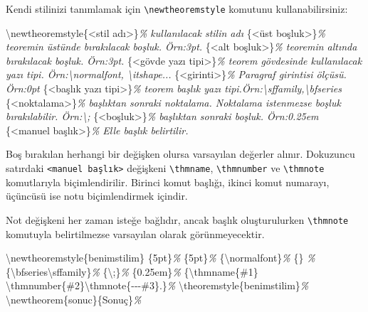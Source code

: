 \documentclass[
  10pt,
]{scrbook}
\newenvironment{Shaded}{\begin{snugshade}}{\end{snugshade}}
\newcommand{\CommentTok}[1]{\textcolor[rgb]{0.56,0.35,0.01}{\textit{#1}}}
\newcommand{\FunctionTok}[1]{\textcolor[rgb]{0.00,0.00,0.00}{#1}}
\newcommand{\NormalTok}[1]{#1}
\theoremstyle{definition}
\theoremstyle{definition}
\theoremstyle{definition}
\theoremstyle{definition}
\theoremstyle{remark}
\begin{document}
Kendi stilinizi tanımlamak için \texttt{\textbackslash{}newtheoremstyle} komutunu
kullanabilirsiniz:

\begin{Shaded}
\begin{Highlighting}[]
\FunctionTok{\textbackslash{}newtheoremstyle}\NormalTok{\{\textless{}stil adı\textgreater{}\}}\CommentTok{\% kullanılacak stilin adı}
\NormalTok{\{\textless{}üst boşluk\textgreater{}\}}\CommentTok{\% teoremin üstünde bırakılacak boşluk. Örn:3pt.}
\NormalTok{\{\textless{}alt boşluk\textgreater{}\}}\CommentTok{\% teoremin altında bırakılacak boşluk. Örn:3pt.}
\NormalTok{\{\textless{}gövde yazı tipi\textgreater{}\}}\CommentTok{\% teorem gövdesinde kullanılacak yazı tipi. Örn:\textbackslash{}normalfont, \textbackslash{}itshape...}
\NormalTok{\{\textless{}girinti\textgreater{}\}}\CommentTok{\% Paragraf girintisi ölçüsü. Örn:0pt}
\NormalTok{\{\textless{}başlık yazı tipi\textgreater{}\}}\CommentTok{\% teorem başlık yazı tipi.Örn:\textbackslash{}sffamily,\textbackslash{}bfseries}
\NormalTok{\{\textless{}noktalama\textgreater{}\}}\CommentTok{\% başlıktan sonraki noktalama. Noktalama istenmezse boşluk bırakılabilir. Örn:\textbackslash{}; }
\NormalTok{\{\textless{}boşluk\textgreater{}\}}\CommentTok{\% başlıktan sonraki boşluk. Örn:0.25em}
\NormalTok{\{\textless{}manuel başlık\textgreater{}\}}\CommentTok{\% Elle başlık belirtilir.}
\end{Highlighting}
\end{Shaded}

Boş bırakılan herhangi bir değişken olursa varsayılan değerler alınır.
Dokuzuncu satırdaki \texttt{\textless{}manuel\ başlık\textgreater{}} değişkeni \texttt{\textbackslash{}thmname}, \texttt{\textbackslash{}thmnumber}
ve \texttt{\textbackslash{}thmnote} komutlarıyla biçimlendirilir. Birinci komut başlığı,
ikinci komut numarayı, üçüncüsü ise notu biçimlendirmek içindir.

Not değişkeni her zaman isteğe bağlıdır, ancak başlık oluşturulurken
\texttt{\textbackslash{}thmnote} komutuyla belirtilmezse varsayılan olarak görünmeyecektir.

\begin{Shaded}
\begin{Highlighting}[]
\FunctionTok{\textbackslash{}newtheoremstyle}\NormalTok{\{benimstilim\}}
\NormalTok{\{5pt\}}\CommentTok{\% }
\NormalTok{\{5pt\}}\CommentTok{\% }
\NormalTok{\{}\FunctionTok{\textbackslash{}normalfont}\NormalTok{\}}\CommentTok{\% }
\NormalTok{\{\} }\CommentTok{\%}
\NormalTok{\{}\FunctionTok{\textbackslash{}bfseries\textbackslash{}sffamily}\NormalTok{\}}\CommentTok{\%}
\NormalTok{\{}\FunctionTok{\textbackslash{};}\NormalTok{\}}\CommentTok{\% }
\NormalTok{\{0.25em\}}\CommentTok{\% }
\NormalTok{\{}\FunctionTok{\textbackslash{}thmname}\NormalTok{\{\#1\} }\FunctionTok{\textbackslash{}thmnumber}\NormalTok{\{\#2\}}\FunctionTok{\textbackslash{}thmnote}\NormalTok{\{{-}{-}{-}\#3\}.\}}\CommentTok{\%}
\FunctionTok{\textbackslash{}theoremstyle}\NormalTok{\{benimstilim\}}\CommentTok{\%}
\FunctionTok{\textbackslash{}newtheorem}\NormalTok{\{sonuc\}\{Sonuç\}}\CommentTok{\%}
\end{Highlighting}
\end{Shaded}
\end{document}
